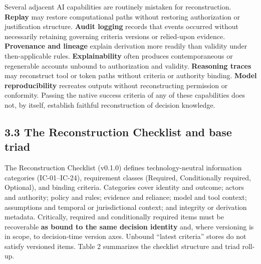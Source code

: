 \documentclass[11pt,a4paper]{article}
\begin{document}
Several adjacent AI capabilities are routinely mistaken for reconstruction. \textbf{Replay} may restore computational paths without restoring authorization or justification structure. \textbf{Audit logging} records that events occurred without necessarily retaining governing criteria versions or relied-upon evidence. \textbf{Provenance and lineage} explain derivation more readily than validity under then-applicable rules. \textbf{Explainability} often produces contemporaneous or regenerable accounts unbound to authorization and validity. \textbf{Reasoning traces} may reconstruct tool or token paths without criteria or authority binding. \textbf{Model reproducibility} recreates outputs without reconstructing permission or conformity. Passing the native success criteria of any of these capabilities does not, by itself, establish faithful reconstruction of decision knowledge.


\subsection{3.3 The Reconstruction Checklist and base triad}

The Reconstruction Checklist (v0.1.0) defines technology-neutral information categories (IC-01--IC-24), requirement classes (Required, Conditionally required, Optional), and binding criteria. Categories cover identity and outcome; actors and authority; policy and rules; evidence and reliance; model and tool context; assumptions and temporal or jurisdictional context; and integrity or derivation metadata. Critically, required and conditionally required items must be recoverable \textbf{as bound to the same decision identity} and, where versioning is in scope, to decision-time version axes. Unbound ``latest criteria'' stores do not satisfy versioned items. Table 2 summarizes the checklist structure and triad roll-up.
\end{document}
